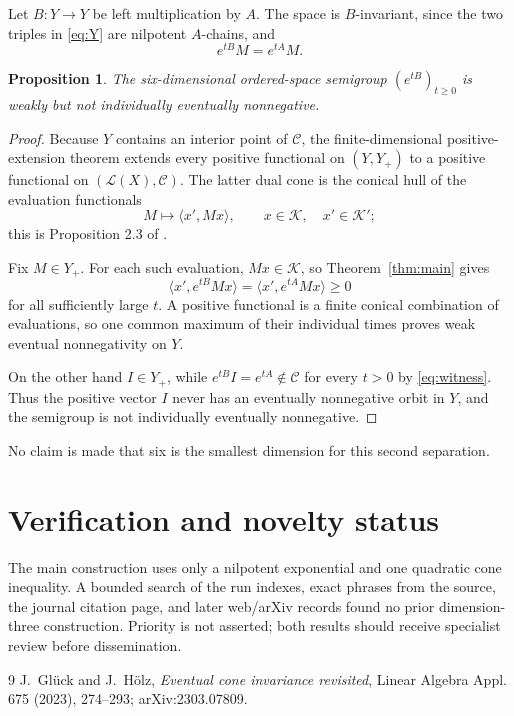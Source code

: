 \documentclass[11pt]{article}
\newtheorem{proposition}{Proposition}
\newcommand{\K}{\mathcal K}
\newcommand{\Lop}{\mathcal L}
\begin{document}
Let $B:Y\to Y$ be left multiplication by $A$.  The space is $B$-invariant,
since the two triples in \eqref{eq:Y} are nilpotent $A$-chains, and
\begin{equation}\label{eq:left}
 e^{tB}M=e^{tA}M.
\end{equation}

\begin{proposition}\label{prop:six}
The six-dimensional ordered-space semigroup $(e^{tB})_{t\geq0}$ is weakly but
not individually eventually nonnegative.
\end{proposition}

\begin{proof}
Because $Y$ contains an interior point of $\mathcal C$, the finite-dimensional
positive-extension theorem extends every positive functional on $(Y,Y_+)$ to
a positive functional on $(\Lop(X),\mathcal C)$.  The latter dual cone is the
conical hull of the evaluation functionals
\[
 M\longmapsto\langle x',Mx\rangle,\qquad x\in\K,\quad x'\in\K';
\]
this is Proposition 2.3 of \cite{GH}.

Fix $M\in Y_+$.  For each such evaluation, $Mx\in\K$, so
Theorem~\ref{thm:main} gives
\[
 \langle x',e^{tB}Mx\rangle
 =\langle x',e^{tA}Mx\rangle\geq0
\]
for all sufficiently large $t$.  A positive functional is a finite conical
combination of evaluations, so one common maximum of their individual times
proves weak eventual nonnegativity on $Y$.

On the other hand $I\in Y_+$, while
$e^{tB}I=e^{tA}\notin\mathcal C$ for every $t>0$ by
\eqref{eq:witness}.  Thus the positive vector $I$ never has an eventually
nonnegative orbit in $Y$, and the semigroup is not individually eventually
nonnegative.
\end{proof}

No claim is made that six is the smallest dimension for this second
separation.

\section{Verification and novelty status}

The main construction uses only a nilpotent exponential and one quadratic
cone inequality.  A bounded search of the run indexes, exact phrases from the
source, the journal citation page, and later web/arXiv records found no prior
dimension-three construction.  Priority is not asserted; both results should
receive specialist review before dissemination.

\begin{thebibliography}{9}
J.~Glück and J.~Hölz,
\emph{Eventual cone invariance revisited},
Linear Algebra Appl. 675 (2023), 274--293;
arXiv:2303.07809.
\end{thebibliography}
\end{document}
